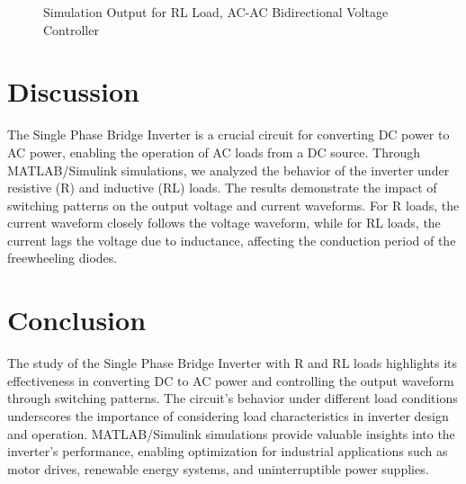 \documentclass[12pt]{article}
\begin{document}
\begin{figure}[H]
    \centering
    \caption{Simulation Output for RL Load, AC-AC Bidirectional Voltage Controller}
    \label{fig:rlLoad}
\end{figure}


\section*{Discussion}
The Single Phase Bridge Inverter is a crucial circuit for converting DC power to AC power, enabling the operation of AC loads from a DC source. Through MATLAB/Simulink simulations, we analyzed the behavior of the inverter under resistive (R) and inductive (RL) loads. The results demonstrate the impact of switching patterns on the output voltage and current waveforms. For R loads, the current waveform closely follows the voltage waveform, while for RL loads, the current lags the voltage due to inductance, affecting the conduction period of the freewheeling diodes.

\section*{Conclusion}
The study of the Single Phase Bridge Inverter with R and RL loads highlights its effectiveness in converting DC to AC power and controlling the output waveform through switching patterns. The circuit's behavior under different load conditions underscores the importance of considering load characteristics in inverter design and operation. MATLAB/Simulink simulations provide valuable insights into the inverter's performance, enabling optimization for industrial applications such as motor drives, renewable energy systems, and uninterruptible power supplies.


\renewcommand{\bibname}{References}

\end{document}
